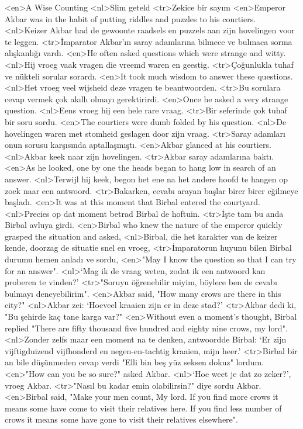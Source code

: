<en>A Wise Counting
<nl>Slim geteld
<tr>Zekice bir sayım
<en>Emperor Akbar was in the habit of putting riddles and puzzles to his courtiers. 
<nl>Keizer Akbar had de gewoonte raadsels en puzzels aan zijn hovelingen voor te leggen. 
<tr>İmparator Akbar'ın saray adamlarına bilmece ve bulmaca sorma alışkanlığı vardı. 
<en>He often asked questions which were strange and witty. 
<nl>Hij vroeg vaak vragen die vreemd waren en geestig.
<tr>Çoğunlukla tuhaf ve nükteli sorular sorardı.
<en>It took much wisdom to answer these questions. 
<nl>Het vroeg veel wijsheid deze vragen te beantwoorden.
<tr>Bu sorulara cevap vermek çok akıllı olmayı gerektirirdi.
<en>Once he asked a very strange question. 
<nl>Eens vroeg hij een hele rare vraag.
<tr>Bir seferinde çok tuhaf bir soru sordu.
<en>The courtiers were dumb folded by his question. 
<nl>De hovelingen waren met stomheid geslagen door zijn vraag.
<tr>Saray adamları onun sorusu karşısında aptallaşmıştı.
<en>Akbar glanced at his courtiers. 
<nl>Akbar keek naar zijn hovelingen.
<tr>Akbar saray adamlarına baktı.
<en>As he looked, one by one the heads began to hang low in search of an answer. 
<nl>Terwijl hij keek, begon het ene na het andere hoofd te hangen op zoek naar een antwoord.
<tr>Bakarken, cevabı arayan başlar birer birer eğilmeye başladı.
<en>It was at this moment that Birbal entered the courtyard. 
<nl>Precies op dat moment  betrad Birbal de hoftuin.
<tr>İşte tam bu anda Birbal avluya girdi.
<en>Birbal who knew the nature of the emperor quickly grasped the situation and asked, 
<nl>Birbal, die het karakter van de keizer kende, doorzag de situatie snel en vroeg,
<tr>İmparatorun huyunu bilen Birbal durumu hemen anladı ve sordu,
<en>"May I know the question so that I can try for an answer". 
<nl>`Mag ik de vraag weten, zodat ik een antwoord kan proberen te vinden?'
<tr>"Soruyu öğrenebilir miyim, böylece ben de cevabı bulmayı deneyebilirim".
<en>Akbar said, "How many crows are there in this city?" 
<nl>Akbar zei: `Hoeveel kraaien zijn er in deze stad?'
<tr>Akbar dedi ki, "Bu şehirde kaç tane karga var?"
<en>Without even a moment's thought, Birbal replied "There are fifty thousand five hundred and eighty nine crows, my lord".
<nl>Zonder zelfs maar een moment na te denken, antwoordde Birbal: `Er zijn vijftigduizend vijfhonderd en negen-en-tachtig kraaien, mijn heer.'
<tr>Birbal bir an bile düşünmeden cevap verdi "Elli bin beş yüz seksen dokuz" lordum.
<en>"How can you be so sure?" asked Akbar. 
<nl>`Hoe weet je dat zo zeker?', vroeg Akbar. 
<tr>"Nasıl bu kadar emin olabilirsin?" diye sordu Akbar.
<en>Birbal said, "Make your men count, My lord. If you find more crows it means some have come to visit their relatives here. If you find less number of crows it means some have gone to visit their relatives elsewhere". 
